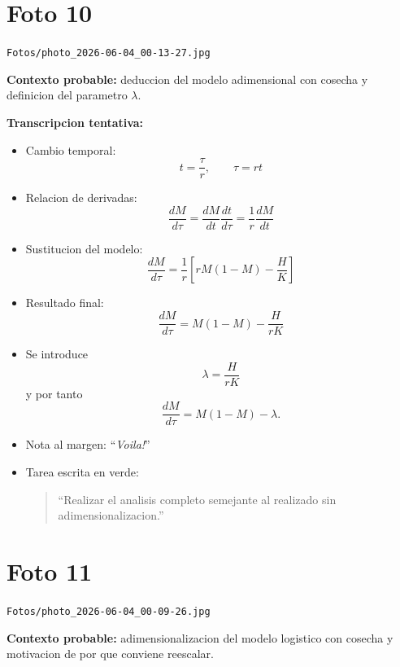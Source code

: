 \documentclass[11pt,letterpaper]{article}
\begin{document}
\section*{Foto 10}
\texttt{Fotos/photo\_2026-06-04\_00-13-27.jpg}

\textbf{Contexto probable:} deduccion del modelo adimensional con cosecha y definicion del parametro \(\lambda\).

\textbf{Transcripcion tentativa:}
\begin{itemize}[leftmargin=*]
    \item Cambio temporal:
    \[
    t=\frac{\tau}{r}, \qquad \tau=rt
    \]
    \item Relacion de derivadas:
    \[
    \frac{dM}{d\tau}=\frac{dM}{dt}\frac{dt}{d\tau}
    =\frac{1}{r}\frac{dM}{dt}
    \]
    \item Sustitucion del modelo:
    \[
    \frac{dM}{d\tau}
    =\frac{1}{r}\left[rM(1-M)-\frac{H}{K}\right]
    \]
    \item Resultado final:
    \[
    \frac{dM}{d\tau}=M(1-M)-\frac{H}{rK}
    \]
    \item Se introduce
    \[
    \lambda=\frac{H}{rK}
    \]
    y por tanto
    \[
    \frac{dM}{d\tau}=M(1-M)-\lambda.
    \]
    \item Nota al margen: ``\textit{Voila!}''
    \item Tarea escrita en verde:
    \begin{quote}
        ``Realizar el analisis completo semejante al realizado sin adimensionalizacion.''
    \end{quote}
\end{itemize}

\section*{Foto 11}
\texttt{Fotos/photo\_2026-06-04\_00-09-26.jpg}

\textbf{Contexto probable:} adimensionalizacion del modelo logistico con cosecha y motivacion de por que conviene reescalar.
\end{document}
